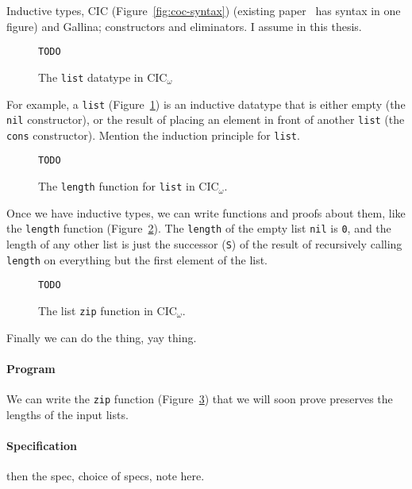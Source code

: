 Inductive types, CIC (Figure~\ref{fig:coc-syntax}) (existing paper~\cite{Timany2015FirstST} has syntax in one figure) and Gallina; constructors and eliminators. I assume  in this thesis.

\begin{figure}
\begin{lstlisting}
TODO
\end{lstlisting}
\caption{The \lstinline{list} datatype in CIC$_{\omega}$}
\label{fig:list-theory}
\end{figure}

For example, a \lstinline{list} (Figure~\ref{fig:list-theory}) is an inductive datatype that is 
either empty (the \lstinline{nil} constructor), or the result
of placing an element in front of another \lstinline{list} (the \lstinline{cons} constructor).
Mention the induction principle for \lstinline{list}.

\begin{figure}
\begin{lstlisting}
TODO
\end{lstlisting}
\caption{The \lstinline{length} function for \lstinline{list} in CIC$_{\omega}$.}
\label{fig:length-theory}
\end{figure}

Once we have inductive types, we can write functions and proofs about them, like the \lstinline{length} function (Figure~\ref{fig:length-theory}).
The \lstinline{length} of the empty list \lstinline{nil} is \lstinline{0}, and the length of any other list
is just the successor (\lstinline{S}) of the result of recursively calling \lstinline{length} on everything but the first element of the list.

\begin{figure}
\begin{lstlisting}
TODO
\end{lstlisting}
\caption{The list \lstinline{zip} function in CIC${_\omega}$.}
\label{fig:zip-theory}
\end{figure}

Finally we can do the thing, yay thing.

\paragraph{Program}
We can write the \lstinline{zip} function (Figure~\ref{fig:zip-theory}) that we will soon prove preserves the lengths of the input lists.

\paragraph{Specification}
then the spec, choice of specs, note here.

